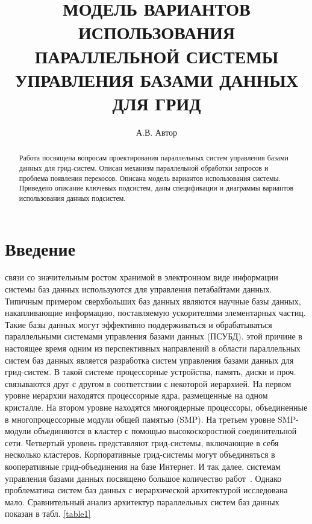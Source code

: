 \documentclass[11pt,oneside]{article}
\begin{document}
\newcommand{\phan}{\hspace*{0cm}}
\newcommand{\comment}{}
\author{А.В. Автор}
\title{МОДЕЛЬ ВАРИАНТОВ ИСПОЛЬЗОВАНИЯ ПАРАЛЛЕЛЬНОЙ СИСТЕМЫ УПРАВЛЕНИЯ БАЗАМИ ДАННЫХ ДЛЯ ГРИД}
\maketitle{}
\begin{abstract}
Работа посвящена вопросам проектирования параллельных систем управления базами данных для грид-систем. Описан механизм параллельной обработки запросов и проблема появления перекосов. Описана модель вариантов использования системы. Приведено описание ключевых подсистем, даны спецификации и диаграммы вариантов использования данных подсистем.
\end{abstract}



\section*{Введение}
 связи со значительным ростом хранимой в электронном виде информации системы баз данных используются для управления петабайтами данных. Типичным примером сверхбольших баз данных являются научные базы данных, накапливающие информацию, поставляемую ускорителями элементарных частиц. Такие базы данных могут эффективно поддерживаться и обрабатываться параллельными системами управления базами данных (ПСУБД).
 этой причине в настоящее время одним из перспективных направлений в области параллельных систем баз данных является разработка систем управления базами данных для грид-систем. В такой системе процессорные устройства, память, диски и проч. связываются друг с другом в соответствии с некоторой иерархией. На первом уровне иерархии находятся процессорные ядра, размещенные на одном кристалле. На втором уровне находятся многоядерные процессоры, объединенные в многопроцессорные модули общей памятью (SMP). На третьем уровне SMP-модули объединяются в кластер с помощью высокоскоростной соединительной сети. Четвертый уровень представляют грид-системы, включающие в себя несколько кластеров. Корпоративные грид-системы могут объединяться в кооперативные грид-объединения на базе Интернет. И так далее.
 системам управления базами данных посвящено большое количество работ~\cite{B_Gray2005, B_Mehta1997, B_Williams1998}. Однако проблематика систем баз данных с иерархической архитектурой исследована мало. Сравнительный анализ архитектур параллельных систем баз данных показан в табл. \ref{table1}
\end{document}
